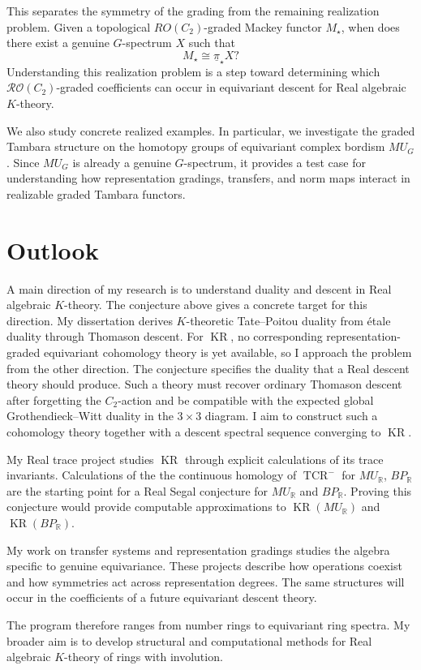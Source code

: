 \documentclass[11pt]{article}
\newcommand{\KR}{\operatorname{KR}}
\begin{document}
This separates the symmetry of the grading from the remaining realization problem.
Given a topological $RO(C_2)$-graded Mackey functor $M_\star$, when does there exist a genuine $G$-spectrum $X$ such that
\[
M_\star \cong \underline{\pi}_\star X?
\]
Understanding this realization problem is a step toward determining which $\mathcal{RO}(C_2)$-graded coefficients can occur in equivariant descent for Real algebraic $K$-theory.

We also study concrete realized examples. 
In particular, we investigate the graded Tambara structure on the homotopy groups of equivariant complex bordism $MU_G$.
Since $MU_G$ is already a genuine $G$-spectrum, it provides a test case for understanding how representation gradings, transfers, and norm maps interact in realizable graded Tambara functors.

\section{Outlook}
A main direction of my research is to understand duality and descent in Real algebraic \(K\)-theory.
The conjecture above gives a concrete target for this direction.
My dissertation derives \(K\)-theoretic Tate--Poitou duality from étale duality through Thomason descent.
For \(\KR\), no corresponding representation-graded equivariant cohomology theory is yet available, so I approach the problem from the other direction.
The conjecture specifies the duality that a Real descent theory should produce.
Such a theory must recover ordinary Thomason descent after forgetting the \(C_2\)-action and be compatible with the expected global Grothendieck--Witt duality in the \(3\times3\) diagram.
I aim to construct such a cohomology theory together with a descent spectral sequence converging to \(\KR\).

My Real trace project studies \(\KR\) through explicit calculations of its trace invariants.
Calculations of the the continuous homology of \(\operatorname{TCR}^{-}\) for \(MU_{\mathbb R}\), \(BP_{\mathbb R}\) are the starting point for a Real Segal conjecture for \(MU_{\mathbb R}\) and \(BP_{\mathbb R}\).
Proving this conjecture would  provide computable approximations to \(\KR(MU_{\mathbb R})\) and \(\KR(BP_{\mathbb R})\).

My work on transfer systems and representation gradings studies the algebra specific to genuine equivariance.
These projects describe how operations coexist and how symmetries act across representation degrees.
The same structures will occur in the coefficients of a future equivariant descent theory.

The program therefore ranges from number rings to equivariant ring spectra.
My broader aim is to develop structural and computational methods for Real algebraic \(K\)-theory of rings with involution.




\end{document}
